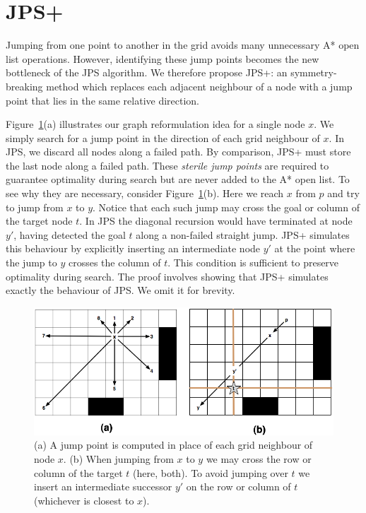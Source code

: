 \section{JPS+}
\label{sec:pre}
Jumping from one point to another in the grid
avoids many unnecessary A* open list operations. However, identifying 
these jump points becomes the new bottleneck of the JPS algorithm. 
We therefore propose JPS+: an symmetry-breaking method which replaces
each adjacent neighbour of a node with a jump point that lies in the 
same relative direction.

Figure~\ref{fig:preproc}(a) illustrates our graph reformulation idea for a 
single node $x$. We simply search for a jump point in the direction
of each grid neighbour of $x$. In JPS, we discard all nodes along a failed
path. By comparison, JPS+ must store the last node along a failed path.
These \emph{sterile jump points} are required 
to guarantee optimality during search but are never added to the A* open list.
To see why they are necessary, consider Figure~\ref{fig:preproc}(b).
Here we reach $x$ from $p$ and try to jump from $x$ to $y$. 
Notice that each such jump may cross the goal or column of the target node
$t$. In JPS the diagonal recursion would have terminated at node $y'$, having detected
the goal $t$ along a non-failed straight jump.
JPS+ simulates this behaviour by explicitly inserting an intermediate node $y'$ 
at the point where the jump to $y$ crosses the column of $t$.
This condition is sufficient to preserve optimality during search. The proof
involves showing that JPS+ simulates exactly the behaviour of JPS. We omit it 
for brevity.

\begin{figure}[tb]
       \begin{center}
		   \includegraphics[width=0.95\columnwidth]
			{diagrams/preproc.png}
       \end{center}
	\vspace{-3pt}
       \caption{(a) A jump point is computed in place of each grid neighbour of node $x$.
		(b) When jumping from $x$ to $y$ we may cross the row or column of the target $t$ (here, both). 
To avoid jumping over $t$ we insert an intermediate successor $y'$ on the row or column of $t$ (whichever is closest to $x$).}

       \label{fig:preproc}
\end{figure}

%



